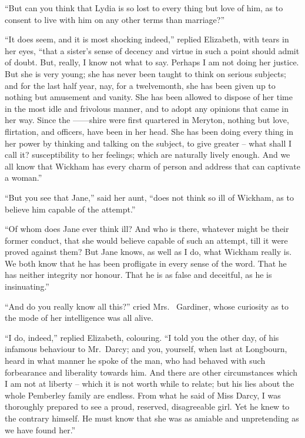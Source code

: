 “But can you think that Lydia is so lost to every thing
but love of him, as to consent to live with him on any
other terms than marriage?”

“It does seem, and it is most shocking indeed,” replied
Elizabeth, with tears in her eyes, “that a sister’s sense
of decency and virtue in such a point should admit of
doubt. But, really, I know not what to say. Perhaps
I am not doing her justice. But she is very young; she
has never been taught to think on serious subjects; and
for the last half year, nay, for a twelvemonth, she has
been given up to nothing but amusement and vanity.
She has been allowed to dispose of her time in the most
idle and frivolous manner, and to adopt any opinions
that came in her way. Since the ------shire were first
quartered in Meryton, nothing but love, flirtation, and
officers, have been in her head. She has been doing
every thing in her power by thinking and talking on the
subject, to give greater -- what shall I call it? susceptibility
to her feelings; which are naturally lively enough.
And we all know that Wickham has every charm of
person and address that can captivate a woman.”

“But you see that Jane,” said her aunt, “does not
think so ill of Wickham, as to believe him capable of the
attempt.”

“Of whom does Jane ever think ill? And who is there,
whatever might be their former conduct, that she would
believe capable of such an attempt, till it were proved
against them? But Jane knows, as well as I do, what
Wickham really is. We both know that he has been
profligate in every sense of the word. That he has neither
integrity nor honour. That he is as false and deceitful,
as he is insinuating.”

“And do you really know all this?” cried Mrs.\ %
Gardiner, whose curiosity as to the mode of her intelligence
was all alive.

“I do, indeed,” replied Elizabeth, colouring. “I told
you the other day, of his infamous behaviour to Mr.\ Darcy;
and you, yourself, when last at Longbourn, heard in what
manner he spoke of the man, who had behaved with such
forbearance and liberality towards him. And there are
other circumstances which I am not at liberty -- which it
is not worth while to relate; but his lies about the whole
Pemberley family are endless. From what he said of
Miss Darcy, I was thoroughly prepared to see a proud,
reserved, disagreeable girl. Yet he knew to the contrary
himself. He must know that she was as amiable and
unpretending as we have found her.”


